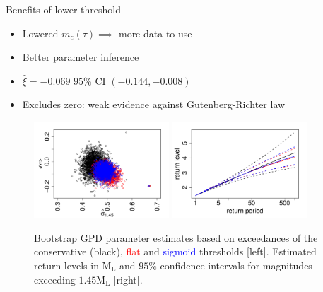 \begin{frame}{Benefits of lower threshold}
\begin{itemize}
\item Lowered $m_c(\tau) \implies$ more data to use
\item Better parameter inference
\item $\hat{\xi}=-0.069$ $95\%$ CI $(-0.144, -0.008)$
\item Excludes zero: weak evidence against Gutenberg-Richter law
\end{itemize}


\begin{figure}
    \centering
    \includegraphics[width = 0.45\textwidth]{images/groningen_application/sigmoid_threshold_selection/parameter_comparison_cons_flat_sigmoid.pdf}
    \qquad
    \includegraphics[width = 0.45\textwidth]{images/groningen_application/sigmoid_threshold_selection/return_level_comparison_cons_flat_sigmoid.pdf}
    \caption{Bootstrap GPD parameter estimates based on exceedances of the conservative (black), \textcolor{red}{flat} and \textcolor{blue}{sigmoid} thresholds [left]. Estimated return levels in $\text{M}_{\text{L}}$ and $95\%$ confidence intervals for magnitudes exceeding $1.45\text{M}_{\text{L}}$ [right]. }
    \label{fig:groningen_threshold_comparison}
\end{figure}
\end{frame}

